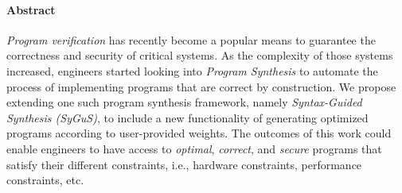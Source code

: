 \paragraph{Abstract}
\emph{Program verification} has recently become a popular means to guarantee the correctness and security of critical systems.
%
As the complexity of those systems increased, engineers started looking into \emph{Program Synthesis} to automate the process of implementing programs that are correct by construction.
%
We propose extending one such program synthesis framework, namely \emph{Syntax-Guided Synthesis (SyGuS)}, to include a new functionality of generating optimized programs according to user-provided weights.
%
The outcomes of this work could enable engineers to have access to \emph{optimal}, \emph{correct}, and \emph{secure} programs that satisfy their different constraints, i.e., hardware constraints, performance constraints, etc.
